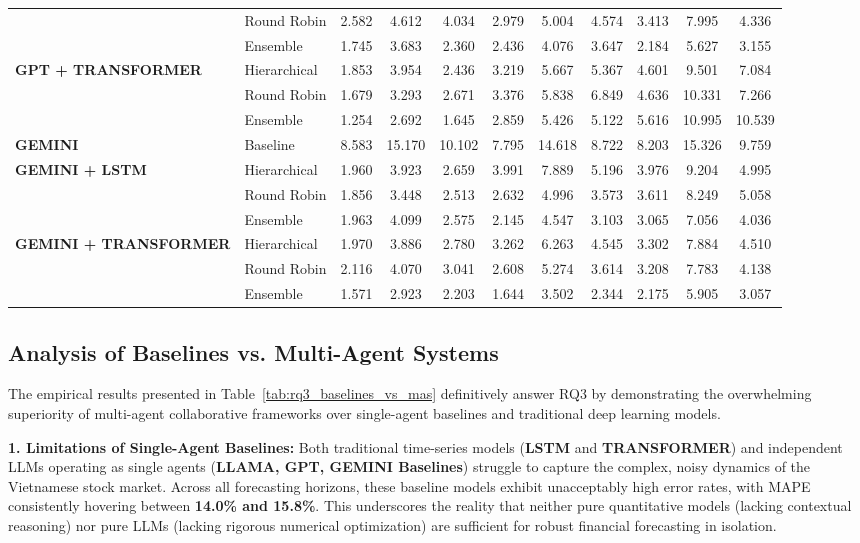 \documentclass{ieeeaccess}
\begin{document}
\begin{table}[t]
{\begin{tabular}{@{}ll | ccc | ccc | ccc@{}}
& Round Robin & 2.582 & 4.612 & 4.034 & 2.979 & 5.004 & 4.574 & 3.413 & 7.995 & 4.336 \\
& Ensemble & 1.745 & 3.683 & 2.360 & 2.436 & 4.076 & 3.647 & 2.184 & 5.627 & 3.155 \\
\midrule
\multirow{3}{*}{\textbf{GPT + TRANSFORMER}} 
& Hierarchical & 1.853 & 3.954 & 2.436 & 3.219 & 5.667 & 5.367 & 4.601 & 9.501 & 7.084 \\
& Round Robin & 1.679 & 3.293 & 2.671 & 3.376 & 5.838 & 6.849 & 4.636 & 10.331 & 7.266 \\
& Ensemble & 1.254 & 2.692 & 1.645 & 2.859 & 5.426 & 5.122 & 5.616 & 10.995 & 10.539 \\
\midrule
\multirow{1}{*}{\textbf{GEMINI}} 
& Baseline & 8.583 & 15.170 & 10.102 & 7.795 & 14.618 & 8.722 & 8.203 & 15.326 & 9.759 \\
\midrule
\multirow{3}{*}{\textbf{GEMINI + LSTM}} 
& Hierarchical & 1.960 & 3.923 & 2.659 & 3.991 & 7.889 & 5.196 & 3.976 & 9.204 & 4.995 \\
& Round Robin & 1.856 & 3.448 & 2.513 & 2.632 & 4.996 & 3.573 & 3.611 & 8.249 & 5.058 \\
& Ensemble & 1.963 & 4.099 & 2.575 & 2.145 & 4.547 & 3.103 & 3.065 & 7.056 & 4.036 \\
\midrule
\multirow{3}{*}{\textbf{GEMINI + TRANSFORMER}} 
& Hierarchical & 1.970 & 3.886 & 2.780 & 3.262 & 6.263 & 4.545 & 3.302 & 7.884 & 4.510 \\
& Round Robin & 2.116 & 4.070 & 3.041 & 2.608 & 5.274 & 3.614 & 3.208 & 7.783 & 4.138 \\
& Ensemble & 1.571 & 2.923 & 2.203 & 1.644 & 3.502 & 2.344 & 2.175 & 5.905 & 3.057 \\
\bottomrule
\end{tabular}
}
\end{table}

\subsection{Analysis of Baselines vs. Multi-Agent Systems}
The empirical results presented in Table~\ref{tab:rq3_baselines_vs_mas} definitively answer RQ3 by demonstrating the overwhelming superiority of multi-agent collaborative frameworks over single-agent baselines and traditional deep learning models.

\textbf{1. Limitations of Single-Agent Baselines:} Both traditional time-series models (\textbf{LSTM} and \textbf{TRANSFORMER}) and independent LLMs operating as single agents (\textbf{LLAMA, GPT, GEMINI Baselines}) struggle to capture the complex, noisy dynamics of the Vietnamese stock market. Across all forecasting horizons, these baseline models exhibit unacceptably high error rates, with MAPE consistently hovering between \textbf{14.0\% and 15.8\%}. This underscores the reality that neither pure quantitative models (lacking contextual reasoning) nor pure LLMs (lacking rigorous numerical optimization) are sufficient for robust financial forecasting in isolation.
\end{document}
